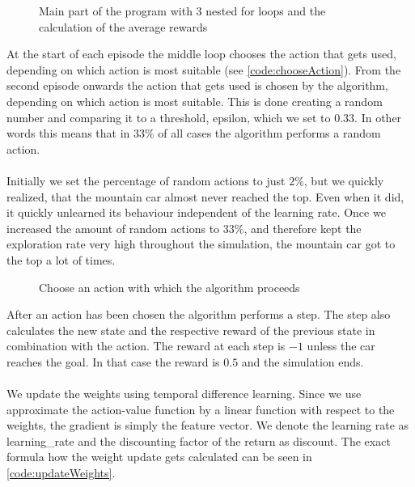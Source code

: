 \documentclass{article}
\begin{document}
	\begin{figure}[h]
		\caption{Main part of the program with 3 nested for loops and the calculation of the average rewards}
		\label{code:loops}
		
	\end{figure}
	
	\FloatBarrier
	
	\noindent At the start of each episode the middle loop chooses the action that gets used, depending on which action is most suitable (see \autoref{code:chooseAction}). From the second episode onwards the action that gets used is chosen by the algorithm, depending on which action is most suitable. This is done creating a random number and comparing it to a threshold, epsilon, which we set to $0.33$. In other words this means that in $33\%$ of all cases the algorithm performs a random action. \\
	\\
	Initially we set the percentage of random actions to just $2\%$, but we quickly realized, that the mountain car almost never reached the top. Even when it did, it quickly unlearned its behaviour independent of the learning rate.  Once we increased the amount of random actions to $33\%$, and therefore kept the exploration rate very high throughout the simulation, the mountain car got to the top a lot of times.
	
	
	\begin{figure}
		\caption{Choose an action with which the algorithm proceeds}
		\label{code:chooseAction}
		
	\end{figure}
	\newpage
	
	\noindent After an action has been chosen the algorithm performs a step. The step also calculates the new state and the respective reward of the previous state in combination with the action. The reward at each step is $-1$ unless the car reaches the goal. In that case the reward is $0.5$ and the simulation ends. \\
	\\
	We update the weights using temporal difference learning. Since we use approximate the action-value function by a linear function with respect to the weights, the gradient is simply the feature vector. We denote the learning rate as learning\_rate and the discounting factor of the return as discount. 
	The exact formula how the weight update gets calculated can be seen in \autoref{code:updateWeights}.
	
\end{document}
